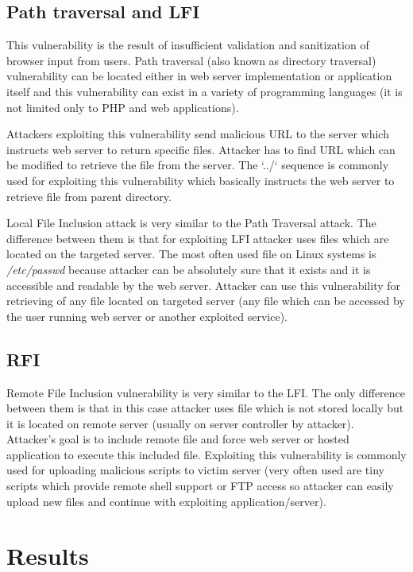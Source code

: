 		\subsection{Path traversal and LFI}
		This vulnerability is the result of insufficient validation and sanitization of browser input from users. Path traversal (also known as directory traversal) vulnerability can be located either in web server implementation or application itself and this vulnerability can exist in a variety of programming languages (it is not limited only to PHP and web applications).
		
		Attackers exploiting this vulnerability send malicious URL to the server which instructs web server to return specific files. Attacker has to find URL which can be modified to retrieve the file from the server. The `../` sequence is commonly used for exploiting this vulnerability which basically instructs the web server to retrieve file from parent directory.
		
		Local File Inclusion attack is very similar to the Path Traversal attack. The difference between them is that for exploiting LFI attacker uses files which are located on the targeted server. The most often used file on Linux systems is \textit{/etc/passwd} because attacker can be absolutely sure that it exists and it is accessible and readable by the web server. Attacker can use this vulnerability for retrieving of any file located on targeted server (any file which can be accessed by the user running web server or another exploited service).
		
		\subsection{RFI}
		Remote File Inclusion vulnerability is very similar to the LFI. The only difference between them is that in this case attacker uses file which is not stored locally but it is located on remote server (usually on server controller by attacker). Attacker's goal is to include remote file and force web server or hosted application to execute this included file. Exploiting this vulnerability is commonly used for uploading malicious scripts to victim server (very often used are tiny scripts which provide remote shell support or FTP access so attacker can easily upload new files and continue with exploiting application/server).
	
	\section{Results}\label{results}

